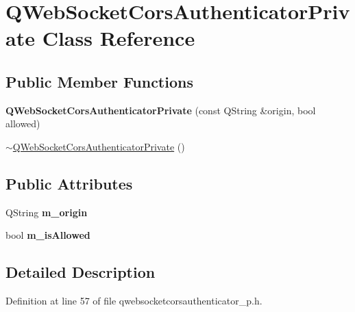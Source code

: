 \hypertarget{class_q_web_socket_cors_authenticator_private}{}\section{Q\+Web\+Socket\+Cors\+Authenticator\+Private Class Reference}
\label{class_q_web_socket_cors_authenticator_private}
\subsection*{Public Member Functions}
\begin{DoxyCompactItemize}
\item 
\mbox{\label{class_q_web_socket_cors_authenticator_private_a5fbd0e7162bf3f37e281970c8e6c7ea8}} 
{\bfseries Q\+Web\+Socket\+Cors\+Authenticator\+Private} (const Q\+String \&origin, bool allowed)
\item 
\mbox{\hyperlink{class_q_web_socket_cors_authenticator_private_a2335f695fd9de6dc3c72a4574fff8ac7}{$\sim$\+Q\+Web\+Socket\+Cors\+Authenticator\+Private}} ()
\end{DoxyCompactItemize}
\subsection*{Public Attributes}
\begin{DoxyCompactItemize}
\item 
\mbox{\label{class_q_web_socket_cors_authenticator_private_aef8b5cf19321e0f11af3649b12e6f94f}} 
Q\+String {\bfseries m\+\_\+origin}
\item 
\mbox{\label{class_q_web_socket_cors_authenticator_private_adc28367a80c673456d22ff1f169e7e38}} 
bool {\bfseries m\+\_\+is\+Allowed}
\end{DoxyCompactItemize}


\subsection{Detailed Description}


Definition at line 57 of file qwebsocketcorsauthenticator\+\_\+p.\+h.



